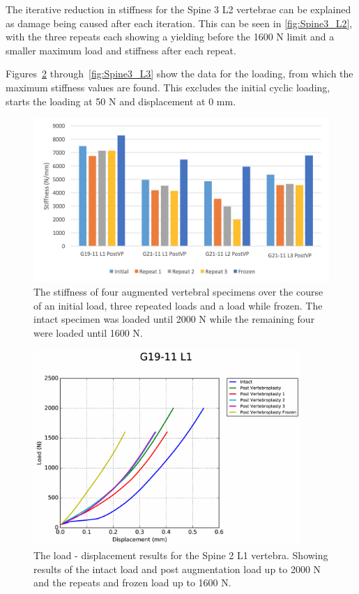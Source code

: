 The iterative reduction in stiffness for the Spine 3 L2 vertebrae can be
explained as damage being caused after each iteration. This can be seen in
\cref{fig:Spine3_L2}, with the three repeats each showing a yielding
before the 1600 N limit and a smaller maximum load and stiffness after each
repeat.

Figures~\ref{fig:Spine2_L1} through~\ref{fig:Spine3_L3} show the data for the
loading, from which the maximum stiffness values are found. This excludes the
initial cyclic loading, starts the loading at 50 N and displacement at 0 mm.

\begin{figure}[!h]
  \centering
 
\includegraphics[width=6in]{Chapters/Chapter_HT_images/experimental_repeats.png}
  \caption{The stiffness of four augmented vertebral specimens over the course
    of an initial load, three repeated loads and a load while frozen. The
intact specimen was loaded until 2000 N while the remaining four were loaded
until 1600 N.}
  \label{fig:exp_repeats}
\end{figure}


\begin{figure}[ht!]
  \centering
  \includegraphics[width=4in]{Chapters/Chapter_HT_images/G19-11_L1.pdf}
  \caption{The load - displacement results for the Spine 2 L1 vertebra. Showing
    results of the intact load and post augmentation load up to 2000 N and the
    repeats and frozen load up to 1600 N.}
  \label{fig:Spine2_L1}
\end{figure}

